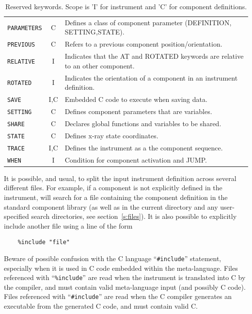 \begin{table}
\begin{center}
{\begin{tabular}{|l|c|p{}|}
      \texttt{PARAMETERS} & C & Defines a class of component parameter (DEFINITION, SETTING,STATE). \\
      \texttt{PREVIOUS} & C & Refers to a previous component position/orientation.\\
      \texttt{RELATIVE} & I & Indicates that the AT and ROTATED keywords are relative to an other component. \\
      \texttt{ROTATED} & I & Indicates the orientation of a component in an instrument definition. \\
      \texttt{SAVE} & I,C & Embedded C code to execute when saving data. \\
      \texttt{SETTING} & C & Defines component parameters that are
      variables. \\
      \texttt{SHARE} & C & Declares global functions and variables to be shared. \\
      \texttt{STATE} & C & Defines x-ray state coordinates. \\
      \texttt{TRACE} & I,C & Defines the instrument as a the component sequence. \\
      \texttt{WHEN}  & I & Condition for component activation and JUMP.\\
      \hline
    \end{tabular}
    \caption{Reserved \MCX keywords.
    Scope is 'I' for instrument and 'C' for component definitions.}
    \label{t:keywords}
    }
  \end{center}
\end{table}

It is possible, and usual, to split the input instrument definition
across several different files. For example, if a component is not
explicitly defined in the instrument,
\MCX will search for a file containing the component definition in the
standard component library (as well as in the current directory and any
user-specified search directories, see section~\ref{s:files}). It is
also possible to explicitly include another file using a line of the
form 
\begin{verbatim}
    %include "file"
\end{verbatim}
Beware of possible confusion with the C language ``\verb+#include+''
statement, especially when it is used in C code embedded within the
\MCX meta-language. Files referenced with ``\verb+%include+'' are read
when the instrument is translated into C by the \MCX compiler, and must
contain valid \MCX meta-language input (and possibly C code). Files referenced with
``\verb+#include+'' are read when the C compiler generates an
executable from the generated C code, and must contain valid C.

